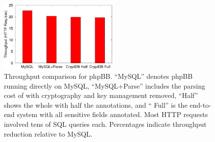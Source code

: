 


\begin{figure}[t]
\centering
\includegraphics[width=2.3in]{fig/tputbars.pdf} 
\vspace{-0.05in}
\caption{Throughput comparison for phpBB\@. ``MySQL'' denotes phpBB
running directly on MySQL, ``MySQL+Parse'' includes the parsing cost
of \name{} with cryptography and key management removed, ``\name Half''
shows the whole \name{} with half the annotations, and ``\name{} Full''
is the end-to-end system with all sensitive fields annotated.  Most
HTTP requests involved tens of SQL queries each.  Percentages indicate
throughput reduction relative to MySQL\@.}

\label{fig:appstput}
\end{figure}






